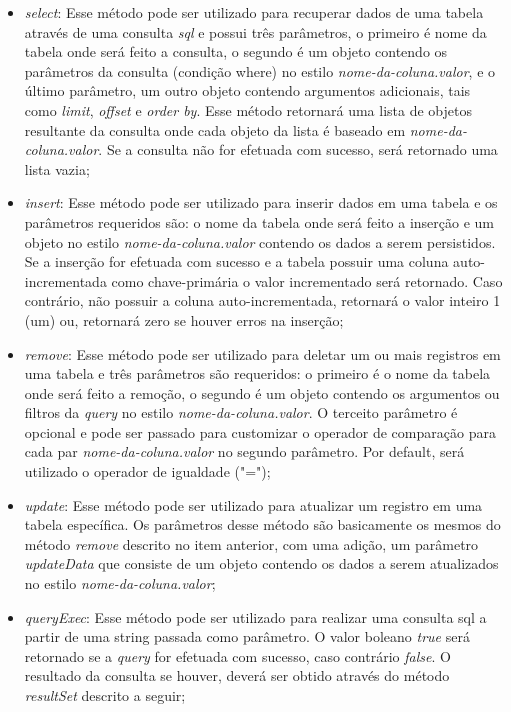 \begin{itemize}
	\item \textit{select}: Esse método pode ser utilizado para recuperar dados de uma tabela através de uma consulta \textit{sql} e possui três parâmetros, o primeiro é nome da tabela onde será feito a consulta, o segundo é um objeto contendo os parâmetros da consulta (condição where) no estilo \textit{nome-da-coluna.valor}, e o último parâmetro, um outro objeto contendo argumentos adicionais, tais como \textit{limit}, \textit{offset} e \textit{order by}. Esse método retornará uma lista de objetos resultante da consulta onde cada objeto da lista é baseado em \textit{nome-da-coluna.valor}. Se a consulta não for efetuada com sucesso, será retornado uma lista vazia;

	\item \textit{insert}: Esse método pode ser utilizado para inserir dados em uma tabela e os parâmetros requeridos são: o nome da tabela onde será feito a inserção e um objeto no estilo \textit{nome-da-coluna.valor} contendo os dados a serem persistidos. Se a inserção for efetuada com sucesso e a tabela possuir uma coluna auto-incrementada como chave-primária o valor incrementado será retornado. Caso contrário, não possuir a coluna auto-incrementada, retornará o valor inteiro 1 (um) ou, retornará zero se houver erros na inserção;

	\item \textit{remove}: Esse método pode ser utilizado para deletar um ou mais registros em uma tabela e três parâmetros são requeridos: o primeiro é o nome da tabela onde será feito a remoção, o segundo é um objeto contendo os argumentos ou filtros da \textit{query} no estilo \textit{nome-da-coluna.valor}. O terceito parâmetro é opcional e pode ser passado para customizar o operador de comparação para cada par \textit{nome-da-coluna.valor} no segundo parâmetro. Por default, será utilizado o operador de igualdade ("=");

	\item \textit{update}: Esse método pode ser utilizado para atualizar um registro em uma tabela específica. Os parâmetros desse método são basicamente os mesmos do método \textit{remove} descrito no item anterior, com uma adição, um parâmetro \textit{updateData} que consiste de um objeto contendo os dados a serem atualizados no estilo \textit{nome-da-coluna.valor};

	\item \textit{queryExec}: Esse método pode ser utilizado para realizar uma consulta sql a partir de uma string passada como parâmetro. O valor boleano \textit{true} será retornado se a \textit{query} for efetuada com sucesso, caso contrário \textit{false}. O resultado da consulta se houver, deverá ser obtido através do método \textit{resultSet} descrito a seguir;


\end{itemize}
